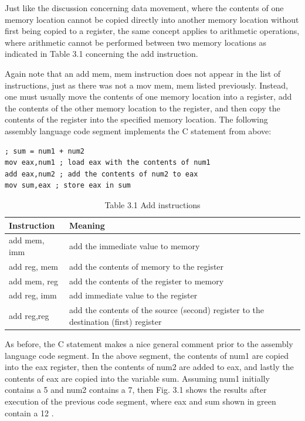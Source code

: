 \documentclass[10pt]{article}
\begin{document}
Just like the discussion concerning data movement, where the contents of one memory location cannot be copied directly into another memory location without first being copied to a register, the same concept applies to arithmetic operations, where arithmetic cannot be performed between two memory locations as indicated in Table 3.1 concerning the add instruction.

Again note that an add mem, mem instruction does not appear in the list of instructions, just as there was not a mov mem, mem listed previously. Instead, one must usually move the contents of one memory location into a register, add the contents of the other memory location to the register, and then copy the contents of the register into the specified memory location. The following assembly language code segment implements the C statement from above:

\begin{verbatim}
; sum = num1 + num2
mov eax,num1 ; load eax with the contents of num1
add eax,num2 ; add the contents of num2 to eax
mov sum,eax ; store eax in sum
\end{verbatim}

\begin{table}[h]
\begin{center}
\captionsetup{labelformat=empty}
\caption{Table 3.1 Add instructions}
\begin{tabular}{|l|l|}
\hline
Instruction & Meaning \\
\hline
add mem, imm & add the immediate value to memory \\
\hline
add reg, mem & add the contents of memory to the register \\
\hline
add mem, reg & add the contents of the register to memory \\
\hline
add reg, imm & add immediate value to the register \\
\hline
add reg,reg & add the contents of the source (second) register to the destination (first) register \\
\hline
\end{tabular}
\end{center}
\end{table}

As before, the C statement makes a nice general comment prior to the assembly language code segment. In the above segment, the contents of num1 are copied into the eax register, then the contents of num2 are added to eax, and lastly the contents of eax are copied into the variable sum. Assuming num1 initially contains a 5 and num2 contains a 7, then Fig. 3.1 shows the results after execution of the previous code segment, where eax and sum shown in green contain a 12 .
\end{document}
